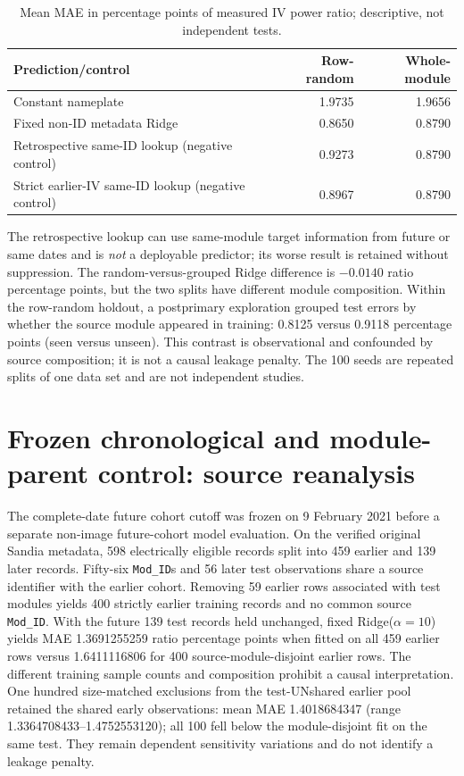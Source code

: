 \documentclass[10pt,a4paper]{article}
\begin{document}
\begin{table}[ht]\centering\small
\caption{Mean MAE in percentage points of measured IV power ratio; descriptive, not independent tests.}
\begin{tabularx}{\linewidth}{@{}Xrr@{}}\toprule
Prediction/control & Row-random & Whole-module \\\midrule
Constant nameplate & 1.9735 & 1.9656 \\
Fixed non-ID metadata Ridge & 0.8650 & 0.8790 \\
Retrospective same-ID lookup (negative control) & 0.9273 & 0.8790 \\
Strict earlier-IV same-ID lookup (negative control) & 0.8967 & 0.8790 \\
\bottomrule\end{tabularx}
\end{table}

The retrospective lookup can use same-module target information from future or same dates and is \emph{not} a deployable predictor; its worse result is retained without suppression. The random-versus-grouped Ridge difference is $-0.0140$ ratio percentage points, but the two splits have different module composition. Within the row-random holdout, a postprimary exploration grouped test errors by whether the source module appeared in training: 0.8125 versus 0.9118 percentage points (seen versus unseen). This contrast is observational and confounded by source composition; it is not a causal leakage penalty. The 100 seeds are repeated splits of one data set and are not independent studies.

\section{Frozen chronological and module-parent control: source reanalysis}
The complete-date future cohort cutoff was frozen on 9 February 2021 before a separate non-image future-cohort model evaluation. On the verified original Sandia metadata, 598 electrically eligible records split into 459 earlier and 139 later records. Fifty-six \texttt{Mod\_ID}s and 56 later test observations share a source identifier with the earlier cohort. Removing 59 earlier rows associated with test modules yields 400 strictly earlier training records and no common source \texttt{Mod\_ID}. With the future 139 test records held unchanged, fixed Ridge(\(\alpha=10\)) yields MAE 1.3691255259 ratio percentage points when fitted on all 459 earlier rows versus 1.6411116806 for 400 source-module-disjoint earlier rows. The different training sample counts and composition prohibit a causal interpretation. One hundred size-matched exclusions from the test-UNshared earlier pool retained the shared early observations: mean MAE 1.4018684347 (range 1.3364708433--1.4752553120); all 100 fell below the module-disjoint fit on the same test. They remain dependent sensitivity variations and do not identify a leakage penalty.
\end{document}
